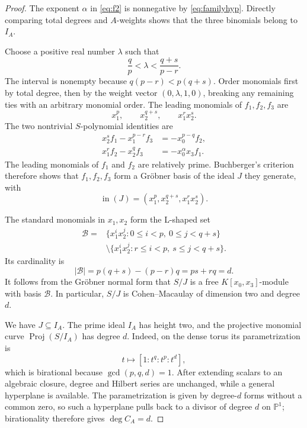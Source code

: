 \documentclass[11pt,reqno]{amsart}
\theoremstyle{definition}
\theoremstyle{remark}
\newcommand{\inideal}{\operatorname{in}}
\begin{document}
\begin{proof}
The exponent $\alpha$ in \eqref{eq:f2} is nonnegative by
\eqref{eq:familyhyp}.  Directly comparing total degrees and $A$-weights
shows that the three binomials belong to $I_A$.

Choose a positive real number $\lambda$ such that
\begin{equation}\label{eq:lambda}
 \frac qp<\lambda<\frac{q+s}{p-r}.
\end{equation}
The interval is nonempty because $q(p-r)<p(q+s)$.  Order monomials first by
total degree, then by the weight vector $(0,\lambda,1,0)$, breaking any
remaining ties with an arbitrary monomial order.  The leading monomials of
$f_1,f_2,f_3$
are
\begin{equation}\label{eq:leading}
 x_1^p,\qquad x_2^{q+s},\qquad x_1^r x_2^s.
\end{equation}
The two nontrivial $S$-polynomial identities are
\begin{align}
 x_2^sf_1-x_1^{p-r}f_3&=-x_0^{p-q}f_2,\label{eq:S1}\\
 x_1^rf_2-x_2^qf_3&=-x_0^\alpha x_3f_1.\label{eq:S2}
\end{align}
The leading monomials of $f_1$ and $f_2$ are relatively prime.  Buchberger's
criterion therefore shows that $f_1,f_2,f_3$ form a Gr\"obner basis of the
ideal $J$ they generate, with
\begin{equation}\label{eq:initJ}
 \inideal(J)=(x_1^p,x_2^{q+s},x_1^rx_2^s).
\end{equation}

The standard monomials in $x_1,x_2$ form the L-shaped set
\begin{equation}\label{eq:Lshape}
 \begin{split}
 \mathcal B={}&\{x_1^ix_2^j:0\leq i<p,\ 0\leq j<q+s\}\\
 &\setminus
 \{x_1^ix_2^j:r\leq i<p,\ s\leq j<q+s\}.
 \end{split}
\end{equation}
Its cardinality is
\begin{equation}\label{eq:Lcount}
 |\mathcal B|=p(q+s)-(p-r)q=ps+rq=d.
\end{equation}
It follows from the Gr\"obner normal form that $S/J$ is a free
$K[x_0,x_3]$-module with basis $\mathcal B$.  In particular, $S/J$ is
Cohen--Macaulay of dimension two and degree $d$.

We have $J\subseteq I_A$.  The prime ideal $I_A$ has height two, and the
projective monomial curve $\operatorname{Proj}(S/I_A)$ has degree $d$.
Indeed, on the dense torus its parametrization is
\[
 t\longmapsto[1:t^q:t^p:t^d],
\]
which is birational because $\gcd(p,q,d)=1$.  After extending scalars to an
algebraic closure, degree and Hilbert series are unchanged, while a general
hyperplane is available.  The parametrization is given by degree-$d$ forms
without a common zero, so such a hyperplane pulls back to a divisor of degree
$d$ on $\mathbb P^1$; birationality therefore gives $\deg C_A=d$.


\end{proof}
\end{document}
